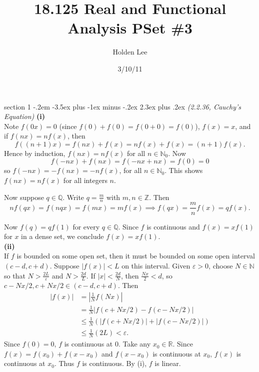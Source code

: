 \documentclass[12pt]{article}
\makeatletter
\theoremstyle{norm}
\newcommand{\N}[0]{\mathbb{N}}
\newcommand{\Q}[0]{\mathbb{Q}}
\newcommand{\R}[0]{\mathbb{R}}
\newcommand{\Z}[0]{\mathbb{Z}}
\newcommand{\rc}[1]{\frac{1}{#1}}
\newcommand{\de}[0]{\delta}
\newcommand{\ep}[0]{\varepsilon}
\newcommand{\ab}[1]{\left| {#1} \right|}
\newcommand{\pa}[1]{\left( {#1} \right)}
\newcommand{\subprob}[1]{\noindent\textbf{#1}\\}
\newcommand{\pf}[2]{\pa{\frac{#1}{#2}}}
\newenvironment{problem}{\@startsection
       {section}
       {1}
       {-.2em}
       {-3.5ex plus -1ex minus -.2ex}
       {2.3ex plus .2ex}
       {\pagebreak[3]%
       \large\bf\noindent{Problem }
       }
       }
       {%
       }
\makeatother
\begin{document}
\title{18.125 Real and Functional Analysis PSet \#3}%
\author{Holden Lee}
\date{3/10/11}%
\maketitle
\thispagestyle{empty}
\begin{problem}{\it (2.2.36, Cauchy's Equation)}
\subprob{(i)}
Note $f(0x)=0$ (since $f(0)+f(0)=f(0+0)=f(0)$), $f(x)=x$, and if $f(nx)=nf(x)$, then %
\[
f((n+1)x)=f(nx)+f(x)=nf(x)+f(x)=(n+1)f(x).
\]
Hence by induction, $f(nx)=nf(x)$ for all $n\in \N_0$. Now
\[
f(-nx)+f(nx)=f(-nx+nx)=f(0)=0
\]
so $f(-nx)=-f(nx)=-nf(x)$, for all $n\in \N_0$. This shows $f(nx)=nf(x)$ for all integers $n$.

Now suppose $q\in \Q$. Write $q=\frac mn$ with $m,n\in \Z$. Then
\[
nf(qx)=f(nqx)=f(mx)=mf(x)\implies f(qx)=\frac mn f(x)=qf(x).
\]

Now $f(q)=qf(1)$ for every $q\in \Q$. Since $f$ is continuous and $f(x)=xf(1)$ for $x$ in a dense set, we conclude $f(x)=xf(1)$.\\

\subprob{(ii)}
If $f$ is bounded on some open set, then it must be bounded on some open interval $(c-d,c+d)$. Suppose $|f(x)|<L$ on this interval. Given $\ep>0$, choose $N\in \N$ so that $N> \frac{2L}{\ep}$ and $N>\frac{2d}{L}$.
If $|x|<\frac{2d}{N}$, then $\frac{Nx}{2}<d$, so $c-Nx/2,c+Nx/2\in (c-d,c+d)$. Then
\begin{align*}
|f(x)|&=\ab{\rc N f(Nx)}\\
&=\rc N|f(c+Nx/2)-f(c-Nx/2)|\\
&\le \rc N\pa{|f(c+Nx/2)|+|f(c-Nx/2)|}\\
&\le \rc N(2L)<\ep.
\end{align*}
Since $f(0)=0$, $f$ is continuous at 0. Take any $x_0\in \R$. Since $f(x)=f(x_0)+f(x-x_0)$ and $f(x-x_0)$ is continuous at $x_0$, $f(x)$ is continuous at $x_0$.
Thus $f$ is continuous. By (i), $f$ is linear.\\


\end{problem}
\end{document}
